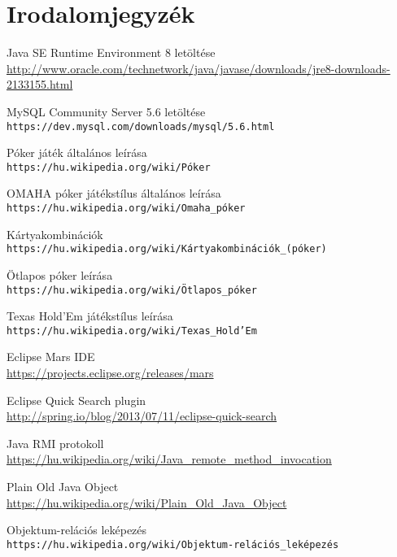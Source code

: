 \part{Irodalomjegyzék}

\begin{thebibliography}{9}

Java SE Runtime Environment 8 letöltése \\
\url{http://www.oracle.com/technetwork/java/javase/downloads/jre8-downloads-2133155.html}

MySQL Community Server 5.6 letöltése \\
\texttt{https://dev.mysql.com/downloads/mysql/5.6.html}

Póker játék általános leírása\\
\texttt{https://hu.wikipedia.org/wiki/Póker}

OMAHA póker játékstílus általános leírása \\
\texttt{https://hu.wikipedia.org/wiki/Omaha\_póker}

Kártyakombinációk \\
\texttt{https://hu.wikipedia.org/wiki/Kártyakombinációk\_(póker)}

Ötlapos póker leírása \\
\texttt{https://hu.wikipedia.org/wiki/Ötlapos\_póker}

Texas Hold'Em játékstílus leírása\\
\texttt{https://hu.wikipedia.org/wiki/Texas\_Hold'Em}

Eclipse Mars IDE \\
\url{https://projects.eclipse.org/releases/mars}

Eclipse Quick Search plugin \\
\url{http://spring.io/blog/2013/07/11/eclipse-quick-search}

Java RMI protokoll \\
\url{https://hu.wikipedia.org/wiki/Java_remote_method_invocation}

Plain Old Java Object \\
\url{https://hu.wikipedia.org/wiki/Plain_Old_Java_Object}

Objektum-relációs leképezés \\
\texttt{https://hu.wikipedia.org/wiki/Objektum-relációs\_leképezés}


\end{thebibliography}
